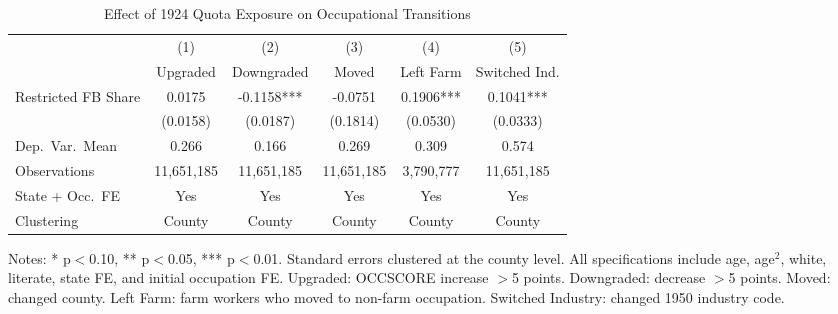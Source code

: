 \begin{table}[H]
\centering
\caption{Effect of 1924 Quota Exposure on Occupational Transitions}
\begin{threeparttable}
\begin{adjustbox}{max width=\textwidth}
\begin{tabular}{lccccc}
\toprule
& (1) & (2) & (3) & (4) & (5) \\
& Upgraded & Downgraded & Moved & Left Farm & Switched Ind. \\
\midrule
Restricted FB Share & 0.0175 & -0.1158*** & -0.0751 & 0.1906*** & 0.1041*** \\
& (0.0158) & (0.0187) & (0.1814) & (0.0530) & (0.0333) \\
\midrule
Dep.\ Var.\ Mean & 0.266 & 0.166 & 0.269 & 0.309 & 0.574 \\
Observations & 11,651,185 & 11,651,185 & 11,651,185 & 3,790,777 & 11,651,185 \\
State + Occ.\ FE & Yes & Yes & Yes & Yes & Yes \\
Clustering & County & County & County & County & County \\
\bottomrule
\end{tabular}
\end{adjustbox}
\begin{tablenotes}[flushleft]
\small
\item Notes: * p$<$0.10, ** p$<$0.05, *** p$<$0.01. Standard errors clustered at the county level. All specifications include age, age$^2$, white, literate, state FE, and initial occupation FE. Upgraded: OCCSCORE increase $>$5 points. Downgraded: decrease $>$5 points. Moved: changed county. Left Farm: farm workers who moved to non-farm occupation. Switched Industry: changed 1950 industry code.
\end{tablenotes}
\end{threeparttable}
\label{tab:outcomes}
\end{table}
